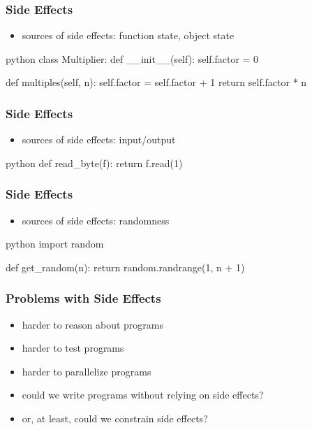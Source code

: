 \documentclass[dvipsnames]{beamer}
\theoremstyle{plain}
\begin{document}
\begin{frame}[fragile]
  \frametitle{Side Effects}

  \begin{itemize}
    \item sources of side effects: function state, object state
  \end{itemize}

  \begin{exampleblock}{}
    \begin{pygments}{python}
class Multiplier:
    def __init__(self):
        self.factor = 0

    def multiples(self, n):
        self.factor = self.factor + 1
        return self.factor * n
    \end{pygments}
  \end{exampleblock}
\end{frame}

\begin{frame}[fragile]
  \frametitle{Side Effects}

  \begin{itemize}
    \item sources of side effects: input/output
  \end{itemize}

  \begin{exampleblock}{}
    \begin{pygments}{python}
def read_byte(f):
    return f.read(1)
    \end{pygments}
  \end{exampleblock}
\end{frame}

\begin{frame}[fragile]
  \frametitle{Side Effects}

  \begin{itemize}
    \item sources of side effects: randomness
  \end{itemize}

  \begin{exampleblock}{}
    \begin{pygments}{python}
import random

def get_random(n):
    return random.randrange(1, n + 1)
    \end{pygments}
  \end{exampleblock}
\end{frame}

\begin{frame}
  \frametitle{Problems with Side Effects}

  \begin{itemize}
    \item harder to reason about programs
    \item harder to test programs
    \item harder to parallelize programs

    \pause
    \bigskip
    \item could we write programs without relying on side effects?
    \item or, at least, could we constrain side effects?
  \end{itemize}
\end{frame}
\end{document}
